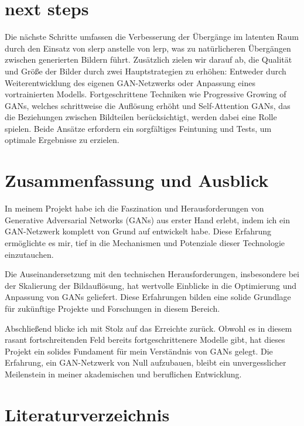 \documentclass[a4paper, 12pt]{article}
\begin{document}
\section{next steps}
Die nächste Schritte umfassen die Verbesserung der Übergänge im latenten Raum durch den Einsatz von slerp anstelle von lerp, was zu natürlicheren Übergängen zwischen generierten Bildern führt. Zusätzlich zielen wir darauf ab, die Qualität und Größe der Bilder durch zwei Hauptstrategien zu erhöhen: Entweder durch Weiterentwicklung des eigenen GAN-Netzwerks oder Anpassung eines vortrainierten Modells. Fortgeschrittene Techniken wie Progressive Growing of GANs, welches schrittweise die Auflösung erhöht und Self-Attention GANs, das die Beziehungen zwischen Bildteilen berücksichtigt, werden dabei eine Rolle spielen. Beide Ansätze erfordern ein sorgfältiges Feintuning und Tests, um optimale Ergebnisse zu erzielen.


\section{Zusammenfassung und Ausblick}
In meinem Projekt habe ich die Faszination und Herausforderungen von Generative Adversarial Networks (GANs) aus erster Hand erlebt, indem ich ein GAN-Netzwerk komplett von Grund auf entwickelt habe. Diese Erfahrung ermöglichte es mir, tief in die Mechanismen und Potenziale dieser Technologie einzutauchen. 

Die Auseinandersetzung mit den technischen Herausforderungen, insbesondere bei der Skalierung der Bildauflösung, hat wertvolle Einblicke in die Optimierung und Anpassung von GANs geliefert. Diese Erfahrungen bilden eine solide Grundlage für zukünftige Projekte und Forschungen in diesem Bereich.

Abschließend blicke ich mit Stolz auf das Erreichte zurück. Obwohl es in diesem rasant fortschreitenden Feld bereits fortgeschrittenere Modelle gibt, hat dieses Projekt ein solides Fundament für mein Verständnis von GANs gelegt. Die Erfahrung, ein GAN-Netzwerk von Null aufzubauen, bleibt ein unvergesslicher Meilenstein in meiner akademischen und beruflichen Entwicklung.


\section{Literaturverzeichnis}


\end{document}
